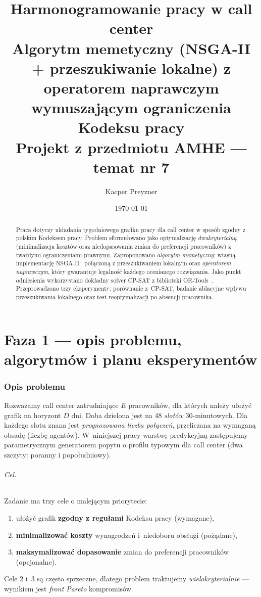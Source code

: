 \documentclass[11pt,a4paper]{article}
\title{\textbf{Harmonogramowanie pracy w call center}\\
\large Algorytm memetyczny (NSGA-II + przeszukiwanie lokalne) z operatorem
naprawczym wymuszaj\k{a}cym ograniczenia Kodeksu pracy\\[4pt]
\normalsize Projekt z przedmiotu AMHE --- temat nr 7}
\author{Kacper Preyzner}
\date{\today}
\begin{document}
\maketitle

\begin{abstract}
Praca dotyczy uk\l adania tygodniowego grafiku pracy dla call center w spos\'ob
zgodny z polskim Kodeksem pracy. Problem sformu\l owano jako optymalizacj\k{e}
\emph{dwukryterialn\k{a}} (minimalizacja koszt\'ow oraz niedopasowania zmian do
preferencji pracownik\'ow) z twardymi ograniczeniami prawnymi. Zaproponowano
\emph{algorytm memetyczny}: w\l asn\k{a} implementacj\k{e} NSGA-II~\cite{deb2002nsga2}
po\l \k{a}czon\k{a} z przeszukiwaniem lokalnym oraz \emph{operatorem naprawczym},
kt\'ory gwarantuje legalno\'s\'c ka\.zdego ocenianego rozwi\k{a}zania. Jako punkt
odniesienia wykorzystano dok\l adny solver CP-SAT z biblioteki OR-Tools~\cite{ortools}.
Przeprowadzono trzy eksperymenty: por\'ownanie z~CP-SAT, badanie ablacyjne wp\l ywu
przeszukiwania lokalnego oraz test reoptymalizacji po absencji pracownika.
\end{abstract}

\tableofcontents
\bigskip

\part*{Faza 1 --- opis problemu, algorytm\'ow i planu eksperyment\'ow}

\section{Opis problemu}
\label{sec:problem}

Rozwa\.zamy call center zatrudniaj\k{a}ce $E$ pracownik\'ow, dla kt\'orych nale\.zy
u\l o\.zy\'c grafik na horyzont $D$ dni. Doba dzielona jest na 48 \emph{slot\'ow}
30-minutowych. Dla ka\.zdego slotu znana jest \emph{prognozowana liczba po\l \k{a}cze\'n},
przeliczana na wymagan\k{a} obsad\k{e} (liczb\k{e} agent\'ow). W~niniejszej pracy
warstw\k{e} predykcyjn\k{a} zast\k{e}pujemy parametrycznym generatorem popytu o profilu
typowym dla call center (dwa szczyty: poranny i popo\l udniowy).

\paragraph{Cel.} Zadanie ma trzy cele o malej\k{a}cym priorytecie:
\begin{enumerate}[noitemsep]
  \item u\l o\.zy\'c grafik \textbf{zgodny z regu\l ami} Kodeksu pracy (wymagane),
  \item \textbf{minimalizowa\'c koszty} wynagrodze\'n i~niedoboru obs\l ugi (po\.z\k{a}dane),
  \item \textbf{maksymalizowa\'c dopasowanie} zmian do preferencji pracownik\'ow (opcjonalne).
\end{enumerate}
Cele 2 i~3 s\k{a} cz\k{e}sto sprzeczne, dlatego problem traktujemy
\emph{wielokryterialnie} --- wynikiem jest \emph{front Pareto} kompromis\'ow.
\end{document}
